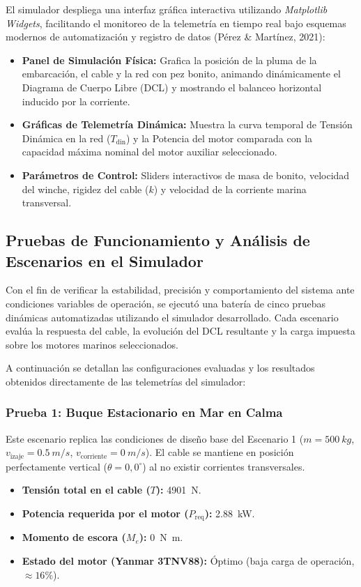 \documentclass[11pt,a4paper]{article}
\begin{document}
El simulador despliega una interfaz gráfica interactiva utilizando \textit{Matplotlib Widgets}, facilitando el monitoreo de la telemetría en tiempo real bajo esquemas modernos de automatización y registro de datos (Pérez \& Martínez, 2021):
\begin{itemize}
    \item \textbf{Panel de Simulación Física:} Grafica la posición de la pluma de la embarcación, el cable y la red con pez bonito, animando dinámicamente el Diagrama de Cuerpo Libre (DCL) y mostrando el balanceo horizontal inducido por la corriente.
    \item \textbf{Gráficas de Telemetría Dinámica:} Muestra la curva temporal de Tensión Dinámica en la red ($T_{\text{din}}$) y la Potencia del motor comparada con la capacidad máxima nominal del motor auxiliar seleccionado.
    \item \textbf{Parámetros de Control:} Sliders interactivos de masa de bonito, velocidad del winche, rigidez del cable ($k$) y velocidad de la corriente marina transversal.
\end{itemize}

\subsection{Pruebas de Funcionamiento y Análisis de Escenarios en el Simulador}
Con el fin de verificar la estabilidad, precisión y comportamiento del sistema ante condiciones variables de operación, se ejecutó una batería de cinco pruebas dinámicas automatizadas utilizando el simulador desarrollado. Cada escenario evalúa la respuesta del cable, la evolución del DCL resultante y la carga impuesta sobre los motores marinos seleccionados.

A continuación se detallan las configuraciones evaluadas y los resultados obtenidos directamente de las telemetrías del simulador:

\subsubsection{Prueba 1: Buque Estacionario en Mar en Calma}
Este escenario replica las condiciones de diseño base del Escenario 1 ($m = \SI{500}{kg}$, $v_{\text{izaje}} = \SI{0.5}{m/s}$, $v_{\text{corriente}} = \SI{0}{m/s}$). El cable se mantiene en posición perfectamente vertical ($\theta = 0,0^\circ$) al no existir corrientes transversales.
\begin{itemize}
    \item \textbf{Tensión total en el cable ($T$):} \SI{4901}{N}.
    \item \textbf{Potencia requerida por el motor ($P_{\text{req}}$):} \SI{2,88}{kW}.
    \item \textbf{Momento de escora ($M_e$):} \SI{0}{N.m}.
    \item \textbf{Estado del motor (Yanmar 3TNV88):} Óptimo (baja carga de operación, $\approx 16\%$).
\end{itemize}
\end{document}
